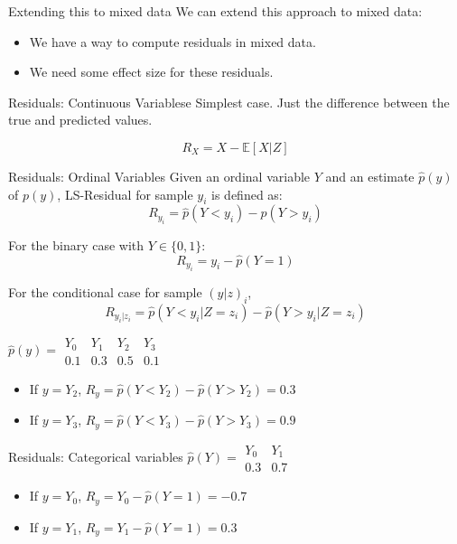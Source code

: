 \documentclass{beamer}
\begin{document}
\begin{frame}{Extending this to mixed data}
	We can extend this approach to mixed data:
	\begin{itemize}
		\item We have a way to compute residuals in mixed data. %
		\item We need some effect size for these residuals. %
	\end{itemize}
\end{frame}

\begin{frame}{Residuals: Continuous Variablese}
	Simplest case. Just the difference between the true and predicted values.

	$$ R_X = X - \mathbb{E}[X | Z] $$

\end{frame}

\begin{frame}{Residuals: Ordinal Variables}
	Given an ordinal variable $ Y $ and an estimate $ \hat{p}(y) $ of $
	p(y) $, LS-Residual for sample $ y_i $ is defined as:
	$$ R_{y_i} = \hat{p}(Y < y_i) - \hat{p}(Y > y_i) $$
	\vspace{1em}

	For the binary case with $ Y \in \{0, 1\} $:
	$$ R_{y_i} = y_i - \hat{p}(Y = 1) $$
	\vspace{1em}

	For the conditional case for sample $ (y|z)_i $,
	$$ R_{y_i | z_i} = \hat{p}(Y < y_i | Z=z_i) - \hat{p}(Y>y_i|Z=z_i) $$

	$ \hat{p}(y) = \begin{array}{llll} Y_0 & Y_1 & Y_2 & Y_3 \\ 0.1 & 0.3 & 0.5 & 0.1 \end{array} $
	\begin{itemize}
		\item If $ y = Y_2 $, $ R_{y} = \hat{p}(Y < Y_2) - \hat{p}(Y > Y_2) = 0.3 $
		\item If $ y = Y_3 $, $ R_{y} = \hat{p}(Y < Y_3) - \hat{p}(Y > Y_3) = 0.9 $
	\end{itemize}
\end{frame}

\begin{frame}{Residuals: Categorical variables}
	$\hat{p}(Y) = \begin{array}{ll} Y_0 & Y_1 \\ 0.3 & 0.7 \end{array} $
	\begin{itemize}	
		\item If $ y = Y_0 $, $ R_{y} = Y_0 - \hat{p}(Y=1) = -0.7 $
		\item If $ y = Y_1 $, $ R_{y} = Y_1 - \hat{p}(Y=1) = 0.3 $
	\end{itemize}
\end{frame}
\end{document}
